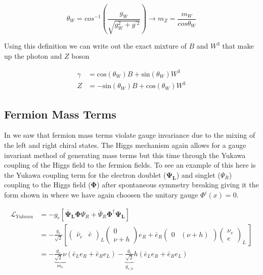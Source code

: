 \begin{equation}
\theta_W = cos^{-1}\left( \frac{g_{W}}{\sqrt{g_{W}^{2}+g^{'2}}} \right) \rightarrow m_{Z} =
\frac{m_{W}}{cos{\theta_{W}}}
\end{equation}

Using this definition we can write out the exact mixture of $B$ and $W^{3}$ that
make up the photon and $Z$ boson

\begin{align}
\gamma &= \text{cos}(\theta_{W})B + \text{sin}(\theta_{W})W^{3} \\
Z &= -\text{sin}(\theta_{W})B + \text{cos}(\theta_{W})W^{3}
\end{align}

\subsection{Fermion Mass Terms} \label{sec:theory:fermion_mass}

In  we saw that fermion mass terms violate gauge
invariance due to the mixing of the left and right chiral states.  The Higgs
mechanism again allows for a gauge invariant method of generating mass terms but
this time through the Yukawa coupling of the Higgs field to the fermion fields.
To see an example of this here is the Yukawa coupling term for the electron
doublet ($\boldsymbol{\Psi_L}$) and singlet ($\Psi_R$) coupling to the Higgs
field ($\boldsymbol{\Phi}$) after spontaneous symmetry breaking giving it the
form shown in  where we have again choosen
the unitary gauge $\Phi^{i}(x) = 0$.

\begin{align}
\mathcal{L}_{Yukawa} &= - g_{e} \left[ \boldsymbol{\bar{\Psi}_L}
\boldsymbol{\Phi} \Psi_R + \bar{\Psi}_{R} \boldsymbol{\Phi}^{\dagger} \boldsymbol{\Psi_L}
\right] \\ &= - \frac{g_{e}}{\sqrt{2}} \left[ \left( \begin{matrix}
\bar{\nu}_{e} & \bar{e} \end{matrix} \right)_L \left( \begin{matrix} 0 \\ \nu +
h \end{matrix} \right) e_{R} + \bar{e}_{R} \left( \begin{matrix} 0 & (\nu + h)
\end{matrix} \right) \left( \begin{matrix} \nu_{e} \\ e \end{matrix} \right)_L \ \right] \\ &= - \underbrace{\frac{g_{e}}{\sqrt{2}}
\nu}_{m_{e}} \left( \bar{e}_{L}e_{R} + \bar{e}_{R}e_{L}  \right)
- \underbrace{\frac{g_{e}}{\sqrt{2}}}_{g_{e,h}} h \left(
\bar{e}_{L}e_{R} + \bar{e}_{R}e_{L}  \right) 
\end{align}

